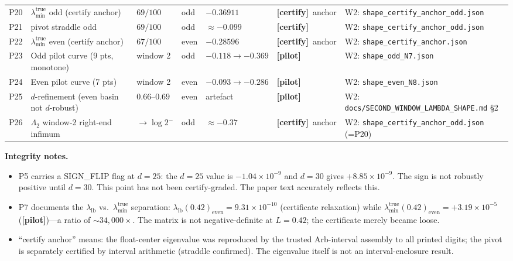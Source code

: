 \documentclass[12pt,a4paper]{amsart}
\theoremstyle{plain}
\theoremstyle{definition}
\newcommand{\ltrue}{\lambda_{\min}^{\mathrm{true}}}
\newcommand{\certify}{\textbf{[certify]}}
\newcommand{\pilot}{\textbf{[pilot]}}
\begin{document}
\begin{table}
\begin{tabular}{@{}lp{.22\textheight}lllp{.18\textheight}l@{}}
P20 & $\ltrue$ odd (certify anchor)                         & $69/100$      & odd  & $-0.36911$                                  & \certify\ anchor    & W2: \texttt{shape\_certify\_anchor\_odd.json} \\
P21 & pivot straddle odd                                    & $69/100$      & odd  & $\approx -0.099$                            & \certify            & W2: \texttt{shape\_certify\_anchor\_odd.json} \\
P22 & $\ltrue$ even (certify anchor)                        & $67/100$      & even & $-0.28596$                                  & \certify\ anchor    & W2: \texttt{shape\_certify\_anchor.json} \\
P23 & Odd pilot curve (9 pts, monotone)                     & window 2      & odd  & $-0.118 \to -0.369$                         & \pilot              & W2: \texttt{shape\_odd\_N7.json} \\
P24 & Even pilot curve (7 pts)                              & window 2      & even & $-0.093 \to -0.286$                         & \pilot              & W2: \texttt{shape\_even\_N8.json} \\
P25 & $d$-refinement (even basin not $d$-robust)            & $0.66$--$0.69$& even & artefact                                    & \pilot              & W2: \texttt{docs/SECOND\_WINDOW\_LAMBDA\_SHAPE.md} §2 \\
P26 & $\Lambda_2$ window-2 right-end infimum                & ${\to}\log2^-$& odd  & $\approx -0.37$                             & \certify\ anchor    & W2: \texttt{shape\_certify\_anchor\_odd.json} (=P20) \\
\bottomrule
\end{tabular}
\end{table}

\bigskip
\noindent\textbf{Integrity notes.}
\begin{itemize}[leftmargin=2em]
  \item P5 carries a SIGN\_FLIP flag at $d=25$: the $d=25$ value is
    $-1.04\times10^{-9}$ and $d=30$ gives $+8.85\times10^{-9}$.  The sign is
    not robustly positive until $d=30$.  This point has not been
    certify-graded.  The paper text accurately reflects this.
  \item P7 documents the $\lambda_{\mathrm{lb}}$ vs.\ $\ltrue$ separation:
    $\lambda_{\mathrm{lb}}(0.42)_{\mathrm{even}} = 9.31\times10^{-10}$
    (certificate relaxation) while $\ltrue(0.42)_{\mathrm{even}} = +3.19\times10^{-5}$
    (\pilot)---a ratio of $\sim34{,}000\times$.  The matrix is not
    negative-definite at $L=0.42$; the certificate merely became loose.
  \item ``certify anchor'' means: the float-center eigenvalue was reproduced
    by the trusted Arb-interval assembly to all printed digits; the pivot
    is separately certified by interval arithmetic (straddle confirmed).
    The eigenvalue itself is not an interval-enclosure result.
\end{itemize}
\end{document}
